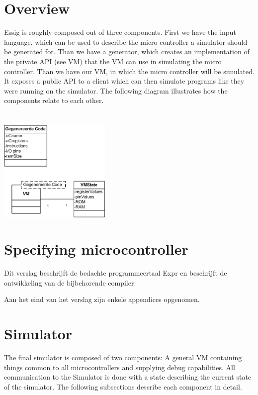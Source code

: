 \documentclass[a4paper]{article}
\begin{document}
\section{}
\clearpage\section{Overview}
{\sffamily
Essig is roughly composed out of three components. First we have the
input language, which can be used to describe the micro controller a
simulator should be generated for. Than we have a generator, which
creates an implementation of the private API (see VM) that the VM can
use in simulating the micro controller. Than we have our VM, in which
the micro controller will be simulated. It exposes a public API to a
client which can then simulate programs like they were running on the
simulator. The following diagram illustrates how the components relate
to each other.}


\bigskip

\section[]{}
\begin{center}
\includegraphics[width=5.376cm,height=4.932cm]{Essig-img002.png}
\end{center}
\clearpage\section{Specifying microcontroller}
{\sffamily
Dit verslag beschrijft de bedachte programmeertaal Expr en beschrijft de
ontwikkeling van de bijbehorende compiler.}

{\sffamily
Aan het eind van het verslag zijn enkele appendices opgenomen. }

\section{}
\clearpage\section{Simulator}
{\sffamily
The final simulator is composed of two components: A general VM
containing things common to all microcontrollers and supplying debug
capabilities. All communication to the Simulator is done with a state
describing the current state of the simulator. The following
subsections describe each component in detail.}
\end{document}
